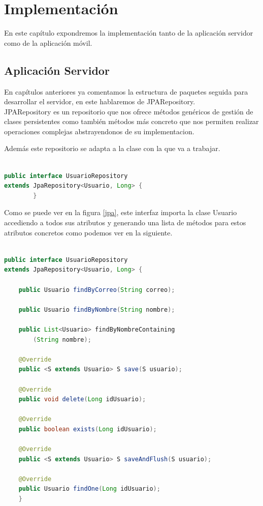 
\section{Implementación}
En este capítulo expondremos la implementación tanto de la aplicación servidor como de la aplicación móvil.



\subsection{ Aplicación Servidor}
En capítulos anteriores ya comentamos la estructura de paquetes seguida para desarrollar el servidor, en este hablaremos de JPARepository.\\

JPARepository es un repositorio que nos ofrece métodos genéricos de gestión de clases persistentes como también métodos más concreto que nos permiten realizar operaciones complejas abstrayendonos de su implementacion.

Además este repositorio se adapta a la clase con la que va a trabajar.
\begin{lstlisting}[language=java,caption={Adaptación a la clase Usuario },label=DescriptiveLabel]
    
public interface UsuarioRepository 
extends JpaRepository<Usuario, Long> {
		}

\end{lstlisting} 
	



	
Como se puede ver en la figura \ref{jpa}, este interfaz importa la clase Usuario accediendo a todos sus atributos y generando una lista de métodos para estos atributos concretos como podemos ver en la siguiente.\\

\begin{lstlisting}[language=java,caption={Interfaz  de UsuarioRepository},label=jpa]
    
public interface UsuarioRepository 
extends JpaRepository<Usuario, Long> {

	public Usuario findByCorreo(String correo);

	public Usuario findByNombre(String nombre);

	public List<Usuario> findByNombreContaining
		(String nombre);

	@Override
	public <S extends Usuario> S save(S usuario);

	@Override
	public void delete(Long idUsuario);

	@Override
	public boolean exists(Long idUsuario);

	@Override
	public <S extends Usuario> S saveAndFlush(S usuario);

	@Override
	public Usuario findOne(Long idUsuario);
	}


\end{lstlisting} 









